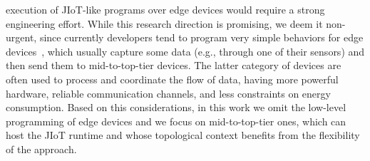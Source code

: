 execution of JIoT-like programs over edge devices would require a strong
engineering effort. While this research direction is promising, we deem it
non-urgent, since currently developers tend to program very simple behaviors
for edge devices~\cite{7123563}, which usually capture some data (e.g.,
through one of their sensors) and then send them to mid-to-top-tier devices.
The latter category of devices are often used to process and coordinate the
flow of data, having more powerful hardware, reliable communication channels,
and less constraints on energy consumption. Based on this considerations, in
this work we omit the low-level programming of edge devices and we focus on
mid-to-top-tier ones, which can host the JIoT runtime and whose topological
context benefits from the flexibility of the approach.
